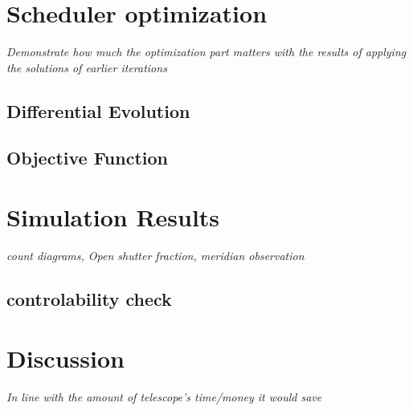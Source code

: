 \documentclass[12pt]{article}
\theoremstyle{definition}
\begin{document}
\section{Scheduler optimization}
\textit{Demonstrate how much the optimization part matters with the results of applying the solutions of earlier iterations}
\subsection{Differential Evolution}

\subsection{Objective Function}

\section{Simulation Results}\label{sec_sim}
\textit{count diagrams, Open shutter fraction, meridian observation}
\subsection{controlability check}\label{sec_sim_cont}
\section{Discussion}
\textit{In line with the amount of telescope's time/money it would save}




\medskip

\newpage 

%


\end{document}

